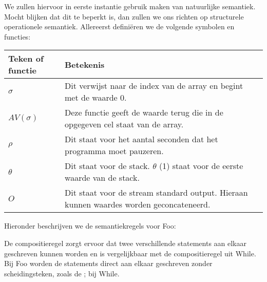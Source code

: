 \documentclass[11pt]{article}
\begin{document}
We zullen hiervoor in eerste instantie gebruik maken van natuurlijke semantiek.
Mocht blijken dat dit te beperkt is, dan zullen we ons richten op structurele operationele semantiek.
Allereerst defini\"eren we de volgende symbolen en functies:
\newline
\newline
\begin{tabular}{ | l | p{12cm} |}
    \hline
    Teken of functie & Betekenis \\ \hline
    \begin{math} \sigma \end{math} &  Dit verwijst naar de index van de array en begint met de waarde 0. \\ \hline
    \begin{math} AV(\sigma) \end{math} & Deze functie geeft de waarde terug die in de opgegeven cel staat van de array. \\ \hline
    \begin{math} \rho \end{math} &  Dit staat voor het aantal seconden dat het programma moet pauzeren. \\ \hline
    \begin{math} \theta \end{math} &  Dit staat voor de stack. \begin{math}\theta\end{math} (1) staat voor de eerste waarde van de stack. \\ \hline
    \begin{math} O \end{math} &  Dit staat voor de stream standard output. Hieraan kunnen waardes worden geconcateneerd. \\ \hline

\end{tabular}
\newline
\newline
\newline
Hieronder beschrijven we de semantiekregels voor Foo:

De compositieregel zorgt ervoor dat twee verschillende statements aan elkaar geschreven kunnen worden en is vergelijkbaar met de compositieregel uit While. 
Bij Foo worden de statements direct aan elkaar geschreven zonder scheidingsteken, zoals de ; bij While.
\end{document}
